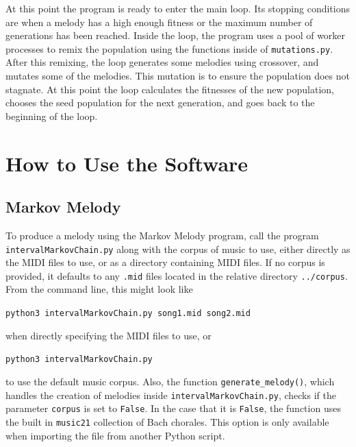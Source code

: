 At this point the program is ready to enter the main loop.
Its stopping conditions are when a melody has a high enough fitness or the maximum number of generations has been reached.
Inside the loop, the program uses a pool of worker processes to remix the population using the functions inside of \texttt{mutations.py}.
After this remixing, the loop generates some melodies using crossover, and mutates some of the melodies.
This mutation is to ensure the population does not stagnate.
At this point the loop calculates the fitnesses of the new population, chooses the seed population for the next generation, and goes back to the beginning of the loop.

\section{How to Use the Software} \label{software:howtouse}

\subsection{Markov Melody} \label{software:howtouse:markov}

To produce a melody using the Markov Melody program, call the program \texttt{intervalMarkovChain.py} along with the corpus of music to use, either directly as the MIDI files to use, or as a directory containing MIDI files.
If no corpus is provided, it defaults to any \texttt{.mid} files located in the relative directory \texttt{../corpus}.
From the command line, this might look like

\texttt{python3 intervalMarkovChain.py song1.mid song2.mid}

\noindent when directly specifying the MIDI files to use, or

\texttt{python3 intervalMarkovChain.py}

\noindent to use the default music corpus.
Also, the function \texttt{generate\_melody()}, which handles the creation of melodies inside \texttt{intervalMarkovChain.py}, checks if the parameter \texttt{corpus} is set to \texttt{False}.
In the case that it is \texttt{False}, the function uses the built in \texttt{music21} collection of Bach chorales.
This option is only available when importing the file from another Python script.


